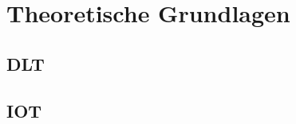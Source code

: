 \chapter{Theoretische Grundlagen}
\label{ch:fundamentals}
\lipsum[1-1]

%
%
\section{DLT}
\label{sec:fundamentals:dlt}
\lipsum[1-1]

%
%
\section{IOT}
\label{sec:fundamentals:iot}
\lipsum[1-1]
